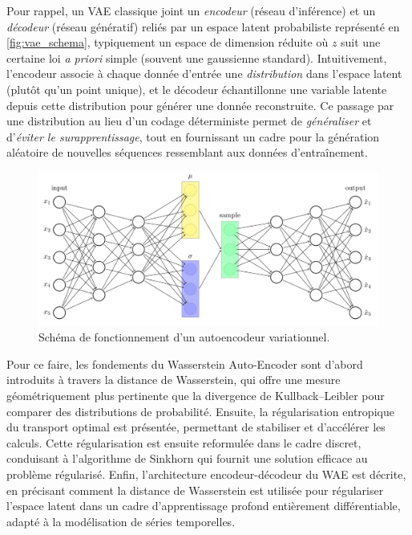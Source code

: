 Pour rappel, un VAE classique joint un \textit{encodeur} (réseau d’inférence) et un \textit{décodeur} (réseau génératif) reliés par un espace latent probabiliste représenté en \autoref{fig:vae_schema}, typiquement un espace de dimension réduite où $z$ suit une certaine loi \textit{a priori} simple (souvent une gaussienne standard). Intuitivement, l’encodeur associe à chaque donnée d’entrée une \textit{distribution} dans l’espace latent (plutôt qu’un point unique), et le décodeur échantillonne une variable latente depuis cette distribution pour générer une donnée reconstruite. Ce passage par une distribution au lieu d’un codage déterministe permet de \textit{généraliser} et d’\textit{éviter le surapprentissage}, tout en fournissant un cadre pour la génération aléatoire de nouvelles séquences ressemblant aux données d’entraînement.

\begin{figure}[H]
    \centering
    \includegraphics[width=1\linewidth]{images/vae.png}
    \caption{Schéma de fonctionnement d'un autoencodeur variationnel.}
    \label{fig:vae_schema}
\end{figure}

Pour ce faire, les fondements du Wasserstein Auto-Encoder sont d’abord introduits à travers la distance de Wasserstein, qui offre une mesure géométriquement plus pertinente que la divergence de Kullback–Leibler pour comparer des distributions de probabilité. Ensuite, la régularisation entropique du transport optimal est présentée, permettant de stabiliser et d’accélérer les calculs. Cette régularisation est ensuite reformulée dans le cadre discret, conduisant à l’algorithme de Sinkhorn qui fournit une solution efficace au problème régularisé. Enfin, l’architecture encodeur-décodeur du WAE est décrite, en précisant comment la distance de Wasserstein est utilisée pour régulariser l’espace latent dans un cadre d’apprentissage profond entièrement différentiable, adapté à la modélisation de séries temporelles.


